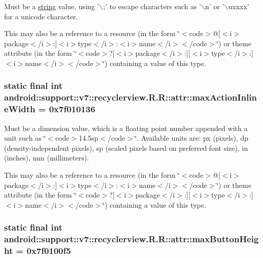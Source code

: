 Must be a \hyperlink{classandroid_1_1support_1_1v7_1_1recyclerview_1_1_r_1_1string}{string} value, using '$\backslash$;' to escape characters such as '$\backslash$n' or '$\backslash$uxxxx' for a unicode character. 

This may also be a reference to a resource (in the form \char`\"{}$<$code$>$@\mbox{[}$<$i$>$package$<$/i$>$:\mbox{]}$<$i$>$type$<$/i$>$:$<$i$>$name$<$/i$>$$<$/code$>$\char`\"{}) or theme attribute (in the form \char`\"{}$<$code$>$?\mbox{[}$<$i$>$package$<$/i$>$:\mbox{]}\mbox{[}$<$i$>$type$<$/i$>$:\mbox{]}$<$i$>$name$<$/i$>$$<$/code$>$\char`\"{}) containing a value of this type. \hypertarget{classandroid_1_1support_1_1v7_1_1recyclerview_1_1_r_1_1attr_3ceba639ac73090ef7acdaea7520bf75}{
\subsubsection[{maxActionInlineWidth}]{\setlength{\rightskip}{0pt plus 5cm}static final int android::support::v7::recyclerview.R.R::attr::maxActionInlineWidth = 0x7f010136}}
\label{classandroid_1_1support_1_1v7_1_1recyclerview_1_1_r_1_1attr_3ceba639ac73090ef7acdaea7520bf75}


Must be a dimension value, which is a floating point number appended with a unit such as \char`\"{}$<$code$>$14.5sp$<$/code$>$\char`\"{}. Available units are: px (pixels), dp (density-independent pixels), sp (scaled pixels based on preferred font size), in (inches), mm (millimeters). 

This may also be a reference to a resource (in the form \char`\"{}$<$code$>$@\mbox{[}$<$i$>$package$<$/i$>$:\mbox{]}$<$i$>$type$<$/i$>$:$<$i$>$name$<$/i$>$$<$/code$>$\char`\"{}) or theme attribute (in the form \char`\"{}$<$code$>$?\mbox{[}$<$i$>$package$<$/i$>$:\mbox{]}\mbox{[}$<$i$>$type$<$/i$>$:\mbox{]}$<$i$>$name$<$/i$>$$<$/code$>$\char`\"{}) containing a value of this type. \hypertarget{classandroid_1_1support_1_1v7_1_1recyclerview_1_1_r_1_1attr_5dfa3af13ea03476154203e1e67d7665}{
\subsubsection[{maxButtonHeight}]{\setlength{\rightskip}{0pt plus 5cm}static final int android::support::v7::recyclerview.R.R::attr::maxButtonHeight = 0x7f0100f5}}
\label{classandroid_1_1support_1_1v7_1_1recyclerview_1_1_r_1_1attr_5dfa3af13ea03476154203e1e67d7665}


